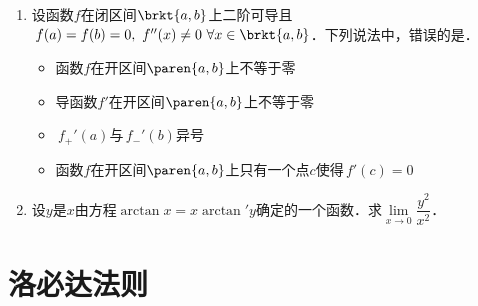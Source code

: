 \documentclass[a4paper,punct=CCT]{ctexbook}
\renewcommand*{\enumparen}[1]{（\makebox[0.6em][c]{\normalfont#1}）}
\theoremstyle{definition}
\theoremstyle{remark}
\newif\ifshowsol
\begin{document}
\begin{enumerate}
  \ifshowsol
  函数\(\frac{\sin x^2}{x}\)是命题\enumparen{1}的反例，对数函数\(\ln x\)是命题\enumparen{2}的反例，恒等函数\(x\)是命题\enumparen{3}的反例．
  \fi

\item 设函数\(f\)在闭区间\(\brkt{a,b}\)上二阶可导且\(\,f(a) = f(b) = 0,\ f\dpr(x) \ne 0\ \forall x \in \brkt{a,b}\)．下列说法中，错误的是\uline{\hspace{8em}}．
  \begin{itemize}
    \renewcommand{\labelitemi}{\faCircleThin}
  \item 函数\(f\)在开区间\(\paren{a,b}\)上不等于零
    \ifshowsol
  \item[\faCircle]
    \else
  \item
    \fi
    导函数\(f'\!\)在开区间\(\paren{a,b}\)上不等于零
  \item \(\,f_+'(a)\)与\(\,f_-'(b)\)异号
  \item 函数\(f\)在开区间\(\paren{a,b}\)上只有一个点\(c\)使得\(\,f'(c) = 0\)
  \end{itemize}

\item 设\(y\)是\(x\)由方程\(\arctan x = x \arctan' y\)确定的一个函数．求\(\lim\limits_{x\to0} \dfrac{y^2}{x^2}\)．

  \ifshowsol
  显然有\(\arctan' y = \frac{1}{1+y^2}\)，所以\(y^2 = \frac{x}{\arctan x} - 1\)．因此，
  \begin{equation*}
    \lim_{x\to0} \frac{y^2}{x^2}
    = \lim_{x\to0} \frac{x-\arctan x}{x^2 \arctan x}
    = \lim_{x\to0} \frac{x-\arctan x}{x^3}
    = \lim_{x\to0} \frac{1-1/(1+x^2)}{3x^2}
    = \lim_{x\to0} \frac{x^2}{3x^2(1+x^2)}
    = \frac13.
  \end{equation*}
  \fi
\end{enumerate}
\fi

\section{洛必达法则}
\end{document}
